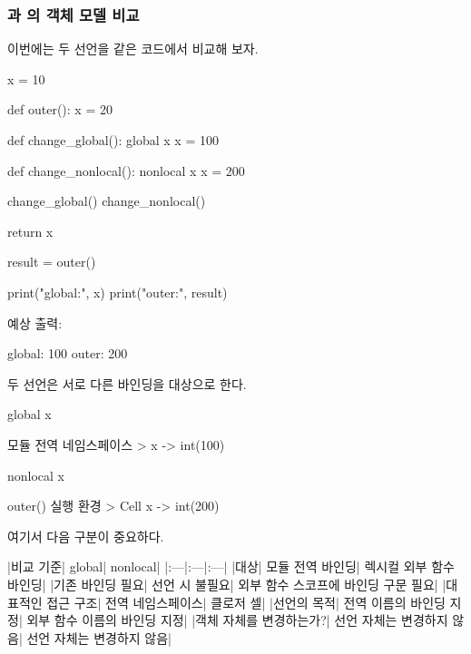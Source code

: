 \subsubsection{과 의 객체 모델 비교}

이번에는 두 선언을 같은 코드에서 비교해 보자.

\begin{dhkcode}
x = 10


def outer():
    x = 20

    def change_global():
        global x
        x = 100

    def change_nonlocal():
        nonlocal x
        x = 200

    change_global()
    change_nonlocal()

    return x


result = outer()

print("global:", x)
print("outer:", result)
\end{dhkcode}

예상 출력:

\begin{dhkzsh}
global: 100
outer: 200
\end{dhkzsh}

두 선언은 서로 다른 바인딩을 대상으로 한다.

\begin{dhknote}
\begin{dhksmry}[centered]
global x
\end{dhksmry}
\end{dhknote}

\begin{dhkdir}[in=6]
모듈 전역 네임스페이스
> x -> int(100)
\end{dhkdir}

\begin{dhknote}
\begin{dhksmry}[centered]
nonlocal x
\end{dhksmry}
\end{dhknote}

\begin{dhkdir}[in=6]
outer() 실행 환경
> Cell x -> int(200)
\end{dhkdir}

여기서 다음 구분이 중요하다.

\begin{dhktable}
|비교 기준|	global|	nonlocal|
|:---|:---|:---|
|대상|	모듈 전역 바인딩|	렉시컬 외부 함수 바인딩|
|기존 바인딩 필요|	선언 시 불필요|	외부 함수 스코프에 바인딩 구문 필요|
|대표적인 접근 구조|	전역 네임스페이스|	클로저 셀|
|선언의 목적|	전역 이름의 바인딩 지정|	외부 함수 이름의 바인딩 지정|
|객체 자체를 변경하는가?|	선언 자체는 변경하지 않음|	선언 자체는 변경하지 않음|
\end{dhktable}

